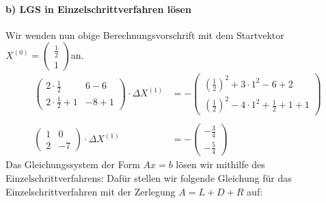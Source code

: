 \begin{comment}
&\text{ bzw. in der Form } J (X^{(k)})\cdot \Delta X= -F(X^{(k)})\\
&\begin{pmatrix}2 x & 6 y - 6 \\ 2 x + 1 & -8 y + 1 \end{pmatrix} \cdot \Delta X=-\begin{pmatrix}x^2 +3 y^2 - 6 y + 2 \\ x^2 - 4 y^2 + x + y + 1\end{pmatrix}
\end{align*}
\paragraph{b)}
\end{comment}
\paragraph*{b) LGS in Einzelschrittverfahren lösen}
Wir wenden nun obige Berechnungsvorschrift mit dem Startvektor $X^{(0)} = \begin{pmatrix}
\frac{1}{2}\\1
\end{pmatrix}$an.
\begin{align*}
 \begin{pmatrix}2 \cdot \frac{1}{2} & 6 - 6 \\ 2 \cdot \frac{1}{2} + 1 & -8 + 1 \end{pmatrix} \cdot \Delta X^{(1)} &= - \begin{pmatrix}(\frac{1}{2})^2 +3 \cdot1^2 - 6 + 2 \\ (\frac{1}{2})^2 - 4 \cdot 1^2 + \frac{1}{2} + 1 + 1\end{pmatrix} \\\\ \begin{pmatrix}1 & 0 \\ 2& -7 \end{pmatrix} \cdot \Delta X^{(1)} &=-\begin{pmatrix}-\frac{3}{4} \\ -\frac{5}{4}\end{pmatrix}
\end{align*}
Das Gleichungssystem der Form $Ax=b$ lösen wir mithilfe des Einzelschrittverfahrens:
Dafür stellen wir folgende Gleichung für das Einzelschrittverfahren mit der Zerlegung $A=L+D+R$ auf:

